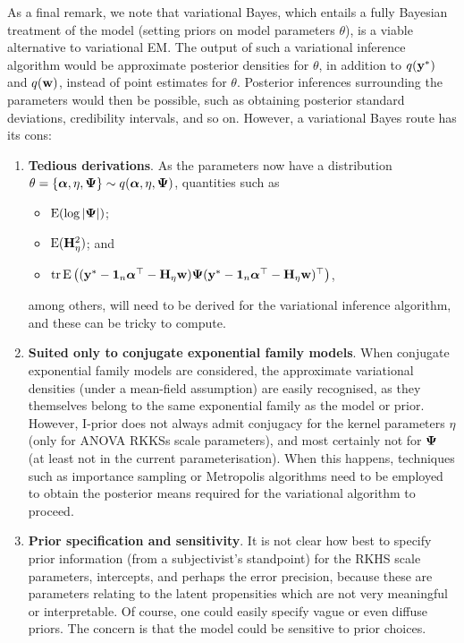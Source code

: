 \documentclass[showframe,11pt,twoside,openright]{report}
\begin{document}
As a final remark, we note that variational Bayes, which entails a fully Bayesian treatment of the model (setting priors on model parameters $\theta$), is a viable alternative to variational EM.
The output of such a variational inference algorithm would be approximate posterior densities for $\theta$, in addition to $q({\mathbf y}^*)$ and $q({\mathbf w})$, instead of point estimates for $\theta$.
Posterior inferences surrounding the parameters would then be possible, such as obtaining posterior standard deviations, credibility intervals, and so on.
However, a variational Bayes route has its cons:
\begin{enumerate}
  \item \textbf{Tedious derivations}. As the parameters now have a distribution $\theta = \{{\bm\alpha},\eta,{\bm\Psi}\} \sim q({\bm\alpha},\eta,{\bm\Psi})$, quantities such as
  \begin{itemize}
    \item $\operatorname{E}(\log \vert {\bm\Psi} \vert)$;
    \item $\operatorname{E}({\mathbf H}_\eta^2)$; and
    \item $\operatorname{tr} \operatorname{E}\big( ({\mathbf y}^*-{\mathbf 1}_n{\bm\alpha}^\top - {\mathbf H}_\eta{\mathbf w}){\bm\Psi} ({\mathbf y}^*-{\mathbf 1}_n{\bm\alpha}^\top - {\mathbf H}_\eta{\mathbf w})^\top \big)$,
  \end{itemize}
  among others, will need to be derived for the variational inference algorithm, and these can be tricky to compute.
  
  \item \textbf{Suited only to conjugate exponential family models}. When conjugate exponential family models are considered, the approximate variational densities (under a mean-field assumption) are easily recognised, as they themselves belong to the same exponential family as the model or prior. However, I-prior does not always admit conjugacy for the kernel parameters $\eta$ (only for ANOVA RKKSs scale parameters), and most certainly not for ${\bm\Psi}$ (at least not in the current parameterisation). When this happens, techniques such as importance sampling or Metropolis algorithms need to be employed to obtain the posterior means required for the variational algorithm to proceed.
  
  \item \textbf{Prior specification and sensitivity}. It is not clear how best to specify prior information (from a subjectivist's standpoint) for the RKHS scale parameters, intercepts, and perhaps the error precision, because these are parameters relating to the latent propensities which are not very meaningful or interpretable. Of course, one could easily specify vague or even diffuse priors. The concern is that the model could be sensitive to prior choices.
\end{enumerate}
\end{document}
